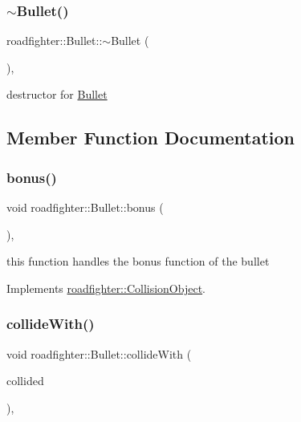 \subsubsection{\texorpdfstring{$\sim$\+Bullet()}{~Bullet()}}
{\footnotesize\ttfamily roadfighter\+::\+Bullet\+::$\sim$\+Bullet (\begin{DoxyParamCaption}{ }\end{DoxyParamCaption})\hspace{0.3cm}{\ttfamily [override]}, {\ttfamily [default]}}

destructor for \hyperlink{classroadfighter_1_1Bullet}{Bullet} 

\subsection{Member Function Documentation}
\mbox{\label{classroadfighter_1_1Bullet_a642ca8467a0ffea844d18d4917b2f49e}} 
\subsubsection{\texorpdfstring{bonus()}{bonus()}}
{\footnotesize\ttfamily void roadfighter\+::\+Bullet\+::bonus (\begin{DoxyParamCaption}{ }\end{DoxyParamCaption})\hspace{0.3cm}{\ttfamily [override]}, {\ttfamily [virtual]}}

this function handles the bonus function of the bullet 

Implements \hyperlink{classroadfighter_1_1CollisionObject_a157e499c27619ceefd6179a459fafd90}{roadfighter\+::\+Collision\+Object}.

\mbox{\label{classroadfighter_1_1Bullet_a36156632331e59c11abf5ae76024bc1f}} 
\subsubsection{\texorpdfstring{collide\+With()}{collideWith()}}
{\footnotesize\ttfamily void roadfighter\+::\+Bullet\+::collide\+With (\begin{DoxyParamCaption}\item[{std\+::shared\+\_\+ptr$<$ \hyperlink{classroadfighter_1_1CollisionObject}{Collision\+Object} $>$ \&}]{collided }\end{DoxyParamCaption})\hspace{0.3cm}{\ttfamily [override]}, {\ttfamily [virtual]}}

